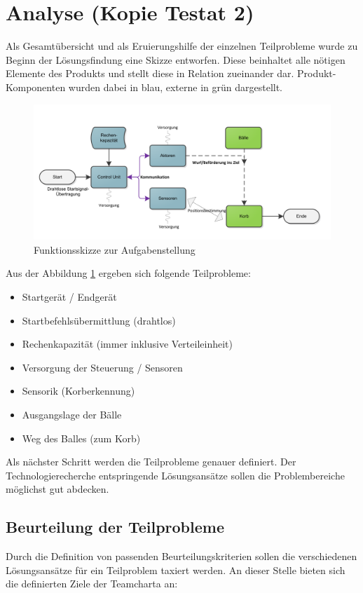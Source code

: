 \section{Analyse (Kopie Testat 2)}
	Als Gesamtübersicht und als Eruierungshilfe der einzelnen Teilprobleme wurde zu Beginn der Lösungsfindung eine Skizze entworfen. Diese beinhaltet alle nötigen Elemente des Produkts und stellt diese in Relation zueinander dar. Produkt-Komponenten wurden dabei in blau, externe in grün dargestellt.
	
	\begin{figure}[h!]
		\includegraphics[width=1.1\textwidth]{Morphologie/Bilder/Blockschaltbild}
		\centering
		\caption{Funktionsskizze zur Aufgabenstellung}
		\label{abb:Blockschaltbild} 
	\end{figure}
	
	Aus der Abbildung \ref{abb:Blockschaltbild} ergeben sich folgende Teilprobleme:
	\begin{itemize}
		\item Startgerät / Endgerät
		\item Startbefehlsübermittlung (drahtlos)
		\item Rechenkapazität (immer inklusive Verteileinheit)
		\item Versorgung der Steuerung / Sensoren
		\item Sensorik (Korberkennung)
		\item Ausgangslage der Bälle
		\item Weg des Balles (zum Korb)
	\end{itemize}
	Als nächster Schritt werden die Teilprobleme genauer definiert. Der Technologierecherche entspringende Lösungsansätze sollen die Problembereiche möglichst gut abdecken.
	
	\subsection{Beurteilung der Teilprobleme}
		Durch die Definition von passenden Beurteilungskriterien sollen die verschiedenen Lösungsansätze für ein Teilproblem taxiert werden. An dieser Stelle bieten sich die definierten Ziele der Teamcharta an:
		
